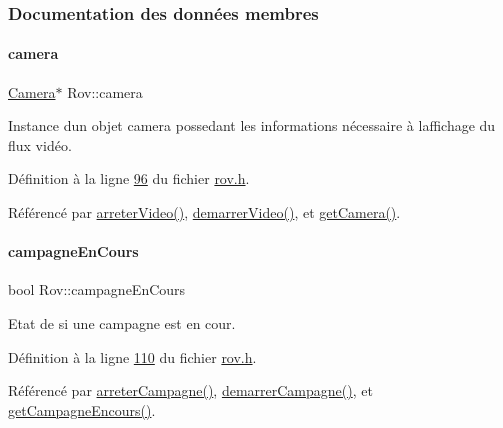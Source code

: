 \subsubsection{Documentation des données membres}
\mbox{\label{class_rov_ad0461ecece812497ee9b4a962f168c18}} 
\paragraph{\texorpdfstring{camera}{camera}}
{\footnotesize\ttfamily \hyperlink{class_camera}{Camera}$\ast$ Rov\+::camera\hspace{0.3cm}{\ttfamily [private]}}



Instance d\textquotesingle{}un objet camera possedant les informations nécessaire à l\textquotesingle{}affichage du flux vidéo. 



Définition à la ligne \hyperlink{rov_8h_source_l00096}{96} du fichier \hyperlink{rov_8h_source}{rov.\+h}.



Référencé par \hyperlink{rov_8cpp_source_l00263}{arreter\+Video()}, \hyperlink{rov_8cpp_source_l00161}{demarrer\+Video()}, et \hyperlink{rov_8cpp_source_l00144}{get\+Camera()}.

\mbox{\label{class_rov_abc9d61d10d8fb5e99283d3775baf98a8}} 
\paragraph{\texorpdfstring{campagne\+En\+Cours}{campagneEnCours}}
{\footnotesize\ttfamily bool Rov\+::campagne\+En\+Cours\hspace{0.3cm}{\ttfamily [private]}}



Etat de si une campagne est en cour. 



Définition à la ligne \hyperlink{rov_8h_source_l00110}{110} du fichier \hyperlink{rov_8h_source}{rov.\+h}.



Référencé par \hyperlink{rov_8cpp_source_l00136}{arreter\+Campagne()}, \hyperlink{rov_8cpp_source_l00123}{demarrer\+Campagne()}, et \hyperlink{rov_8cpp_source_l00175}{get\+Campagne\+Encours()}.

